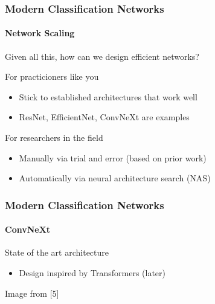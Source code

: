 \documentclass[xetex,professionalfont]{beamer}
\renewcommand\emph[1]{\textcolor{tuwcvl_cvl_blue}{#1}}
\begin{document}
\begin{frame}
	\frametitle{Modern Classification Networks}
	\framesubtitle{Network Scaling}

	Given all this, how can we design efficient networks?

	\bigskip
	For practicioners like you
	\begin{itemize}
		\item Stick to established architectures that work well
		\item ResNet, EfficientNet, ConvNeXt are examples
	\end{itemize}

	\bigskip
	For researchers in the field
	\begin{itemize}
		\item Manually via trial and error (based on prior work)
		\item Automatically via \emph{neural architecture search} (\emph{NAS}) %
	\end{itemize}

\end{frame}


\begin{frame}
	\frametitle{Modern Classification Networks}
	\framesubtitle{ConvNeXt}

	State of the art architecture
	\begin{itemize}
		\item Design inspired by Transformers (later)
	\end{itemize}

	\medskip

	\begin{center}
		{\centering Image from [5]}
	\end{center}

\end{frame}
\end{document}
